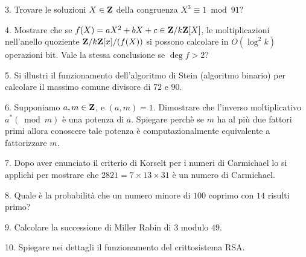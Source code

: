 \item{3.} Trovare le soluzioni $X\in{\bf Z}$ della congruenza $X^3\equiv 1\bmod 91$?
\vv


\item{4.} Mostrare che se $f(X)=aX^2+bX+c\in{\bf Z}/k{\bf Z}[X]$, le moltiplicazioni nell'anello quoziente ${\bf Z}/k{\bf Z}[x]/(f(X))$ 
si possono calcolare in $O(\log^2 k)$ operazioni bit. Vale la stessa conclusione se $\deg f>2$?
\vv


\item{5.} Si illustri il funzionamento dell'algoritmo di Stein (algoritmo binario) per calcolare il massimo comune divisore
di $72$ e $90$.
\ve\vs

\item{6.} Supponiamo $a, m\in{\bf Z}$, e $(a,m)=1$. Dimostrare che l'inverso moltiplicativo $a^*(\bmod m)$ \`e una potenza 
di $a$. Spiegare perch\`e se $m$ ha al pi\`u due fattori primi allora conoscere tale potenza \`e computazionalmente equivalente
a fattorizzare $m$.

\vv

\item{7.} Dopo aver enunciato il criterio di Korselt per i numeri di Carmichael lo si applichi per mostrare che
$2821=7\times 13\times 31$ \`e un numero di Carmichael.
\vv

\item{8.} Quale è la probabilità che un numero minore di $100$ coprimo con $14$ risulti primo?
\ve \vs

\item{9.} Calcolare la successione di Miller Rabin di $3$ modulo $49$.
\vv

\item{10.} Spiegare nei dettagli il funzionamento del crittosistema RSA.
\ \vst

 \bye
